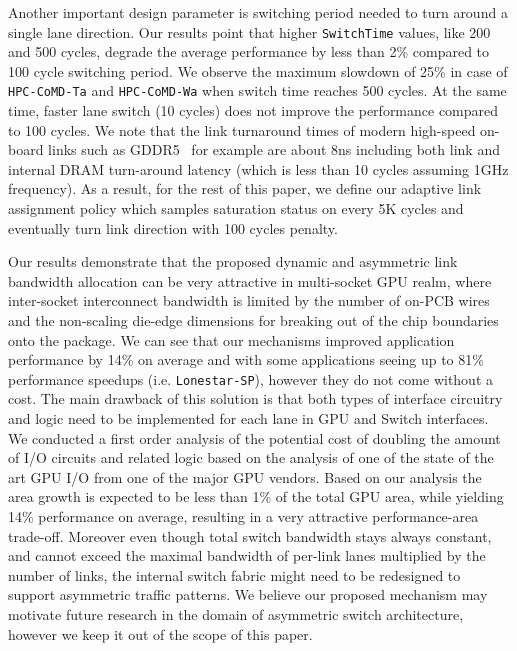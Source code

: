 Another important design parameter is switching period needed to turn around a
single lane direction. Our results point that higher \texttt{SwitchTime}
values, like 200 and 500 cycles, degrade the average performance by less than
2\% compared to 100 cycle switching period. We observe the maximum slowdown of
25\% in case of \texttt{HPC-CoMD-Ta} and \texttt{HPC-CoMD-Wa} when switch time
reaches 500 cycles. At the same time, faster lane switch (10 cycles) does not
improve the performance compared to 100 cycles. We note that the link
turnaround times of modern high-speed on-board links such as
GDDR5~\cite{hynixgddr51Gb} for example
are about 8ns including both link and internal DRAM turn-around latency (which is less than 10 cycles
assuming 1GHz frequency). As a result, for the rest of
this paper, we define our
adaptive link assignment policy which samples saturation status on every 5K
cycles and eventually turn link direction with 100 cycles penalty.

Our results demonstrate that the proposed dynamic and asymmetric link bandwidth
allocation can be very attractive in multi-socket GPU realm, where inter-socket
interconnect bandwidth is limited by the number of on-PCB wires and the
non-scaling die-edge dimensions for breaking out of the chip boundaries onto
the package. We can see that our mechanisms improved application performance by
14\% on average and with some applications seeing up to 81\% performance
speedups (i.e. \texttt{Lonestar-SP}), however they do not come without a cost.
The main drawback of this solution is that both types of interface circuitry
and logic need to be implemented for each lane in GPU and Switch interfaces.
We conducted a first order analysis of the potential cost of doubling the amount
of I/O circuits and related logic based on the analysis of one of the state of
the art GPU I/O from one of the major GPU vendors. Based on our analysis the area
growth is expected to be less than 1\% of the total GPU area, while yielding
14\% performance on average, resulting in a very attractive performance-area trade-off.  
Moreover even though total switch bandwidth stays always constant, and cannot
exceed the maximal bandwidth of per-link lanes multiplied by the number of
links, the internal switch fabric might need to be redesigned to support
asymmetric traffic patterns. We believe our proposed mechanism may motivate
future research in the domain of asymmetric switch architecture, however we
keep it out of the scope of this paper.

 




